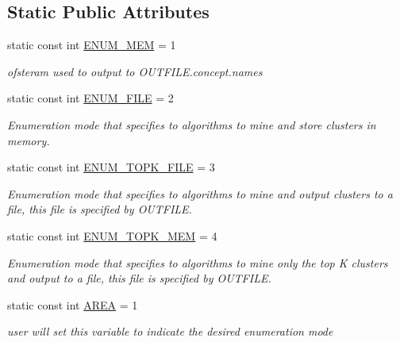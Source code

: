 \subsection*{Static Public Attributes}
\begin{DoxyCompactItemize}
\item 
static const int \hyperlink{class_lattice_algos_a80df6360d3246d74ae31e51e6c4bfa0e}{ENUM\_\-MEM} = 1
\begin{DoxyCompactList}\small\item\em ofsteram used to output to OUTFILE.concept.names \item\end{DoxyCompactList}\item 
static const int \hyperlink{class_lattice_algos_a824804a33640782553f2b399b28fde13}{ENUM\_\-FILE} = 2
\begin{DoxyCompactList}\small\item\em Enumeration mode that specifies to algorithms to mine and store clusters in memory. \item\end{DoxyCompactList}\item 
static const int \hyperlink{class_lattice_algos_a04a0ea3a71c5b598242fa4ec3d4fce79}{ENUM\_\-TOPK\_\-FILE} = 3
\begin{DoxyCompactList}\small\item\em Enumeration mode that specifies to algorithms to mine and output clusters to a file, this file is specified by OUTFILE. \item\end{DoxyCompactList}\item 
static const int \hyperlink{class_lattice_algos_a1c6a4b5dce3ccade9e17ce4b2a6afbe7}{ENUM\_\-TOPK\_\-MEM} = 4
\begin{DoxyCompactList}\small\item\em Enumeration mode that specifies to algorithms to mine only the top K clusters and output to a file, this file is specified by OUTFILE. \item\end{DoxyCompactList}\item 
static const int \hyperlink{class_lattice_algos_a0a79ddaab00906dea5756ac05a4861a5}{AREA} = 1
\begin{DoxyCompactList}\small\item\em user will set this variable to indicate the desired enumeration mode \item\end{DoxyCompactList}\item 

\end{DoxyCompactItemize}

